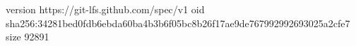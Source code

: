 version https://git-lfs.github.com/spec/v1
oid sha256:34281bed0fdb6ebda60ba4b3b6f05bc8b26f17ae9de767992992693025a2cfe7
size 92891
